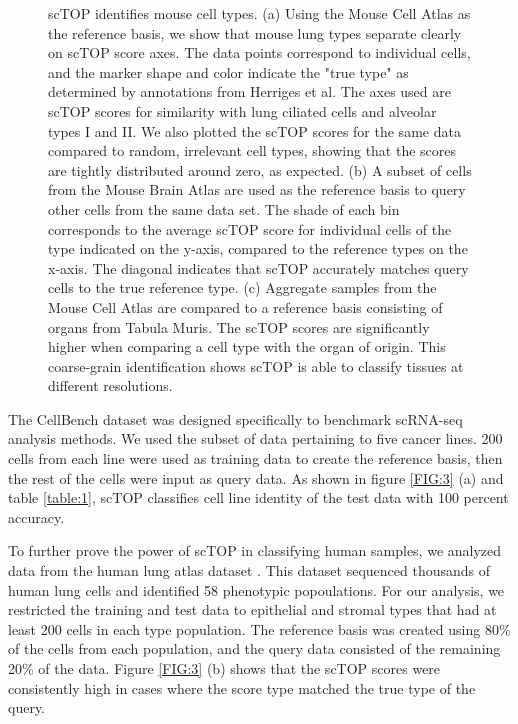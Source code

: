 \documentclass[aps,superscriptaddress, notitlepage,longbibliography]{revtex4-1}
\begin{document}
\begin{figure}
	\caption{scTOP identifies mouse cell types. (a) Using the Mouse Cell Atlas as the reference basis, we show that mouse lung types separate clearly on scTOP score axes. The data points correspond to individual cells, and the marker shape and color indicate the "true type" as determined by annotations from Herriges et al. The axes used are scTOP scores for similarity with lung ciliated cells and alveolar types I and II. We also plotted the scTOP scores for the same data compared to random, irrelevant cell types, showing that the scores are tightly distributed around zero, as expected. (b) A subset of cells from the Mouse Brain Atlas are used as the reference basis to query other cells from the same data set. The shade of each bin corresponds to the average scTOP score for individual cells of the type indicated on the y-axis, compared to the reference types on the x-axis. The diagonal indicates that scTOP accurately matches query cells to the true reference type. (c) Aggregate samples from the Mouse Cell Atlas are compared to a reference basis consisting of organs from Tabula Muris. The scTOP scores are significantly higher when comparing a cell type with the organ of origin. This coarse-grain identification shows scTOP is able to classify tissues at different resolutions.}
	\label{FIG:2}
\end{figure}

The CellBench dataset \cite{tian_benchmarking_2019} was designed specifically to benchmark scRNA-seq analysis methods. We used the subset of data pertaining to five cancer lines. 200 cells from each line were used as training data to create the reference basis, then the rest of the cells were input as query data. As shown in figure \ref{FIG:3} (a) and table \ref{table:1}, scTOP classifies cell line identity of the test data with 100 percent accuracy.

To further prove the power of scTOP in classifying human samples, we analyzed data from the human lung atlas dataset \cite{travaglini_molecular_2020}. This dataset sequenced thousands of human lung cells and identified 58 phenotypic popoulations. For our analysis, we restricted the training and test data to epithelial and stromal types that had at least 200 cells in each type population. The reference basis was created using 80\% of the cells from each population, and the query data consisted of the remaining 20\% of the data. Figure \ref{FIG:3} (b) shows that the scTOP scores were consistently high in cases where the score type matched the true type of the query.
\end{document}
